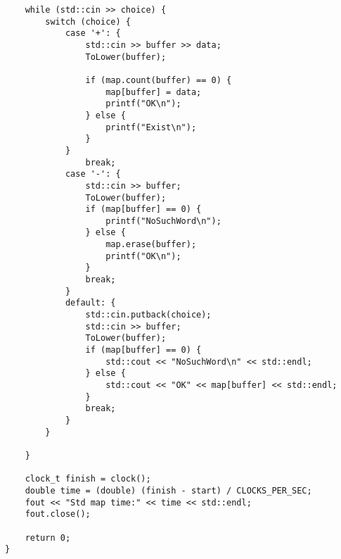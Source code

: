 \documentclass[pdf, unicode, 12pt, a4paper,oneside,fleqn]{article}
\begin{document}
\begin{itemize}
\begin{lstlisting}
    while (std::cin >> choice) {
        switch (choice) {
            case '+': {
                std::cin >> buffer >> data;
                ToLower(buffer);

                if (map.count(buffer) == 0) {
                    map[buffer] = data;
                    printf("OK\n");
                } else {
                    printf("Exist\n");
                }
            }
                break;
            case '-': {
                std::cin >> buffer;
                ToLower(buffer);
                if (map[buffer] == 0) {
                    printf("NoSuchWord\n");
                } else {
                    map.erase(buffer);
                    printf("OK\n");
                }
                break;
            }
            default: {
                std::cin.putback(choice);
                std::cin >> buffer;
                ToLower(buffer);
                if (map[buffer] == 0) {
                    std::cout << "NoSuchWord\n" << std::endl;
                } else {
                    std::cout << "OK" << map[buffer] << std::endl;
                }
                break;
            }
        }

    }

    clock_t finish = clock();
    double time = (double) (finish - start) / CLOCKS_PER_SEC;
    fout << "Std map time:" << time << std::endl;
    fout.close();

    return 0;
}
\end{lstlisting}

\end{itemize}
\newpage
\end{document}
